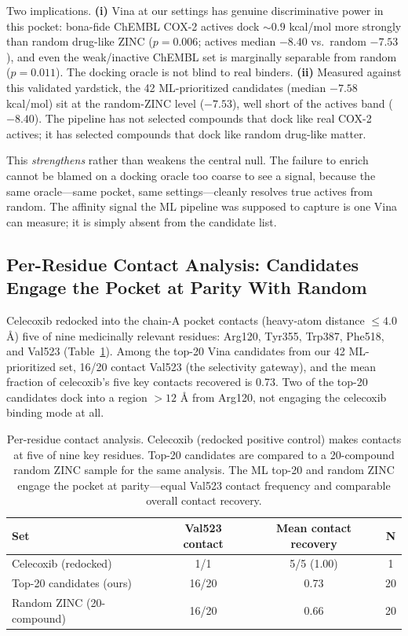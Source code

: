 \documentclass[11pt]{article}
\begin{document}
Two implications. \textbf{(i)} Vina at our settings has genuine discriminative power in this pocket: bona-fide ChEMBL COX-2 actives dock $\sim 0.9$ kcal/mol more strongly than random drug-like ZINC ($p = 0.006$; actives median $-8.40$ vs.\ random $-7.53$), and even the weak/inactive ChEMBL set is marginally separable from random ($p = 0.011$). The docking oracle is not blind to real binders. \textbf{(ii)} Measured against this validated yardstick, the 42 ML-prioritized candidates (median $-7.58$ kcal/mol) sit at the random-ZINC level ($-7.53$), well short of the actives band ($-8.40$). The pipeline has not selected compounds that dock like real COX-2 actives; it has selected compounds that dock like random drug-like matter.

This \emph{strengthens} rather than weakens the central null. The failure to enrich cannot be blamed on a docking oracle too coarse to see a signal, because the same oracle---same pocket, same settings---cleanly resolves true actives from random. The affinity signal the ML pipeline was supposed to capture is one Vina can measure; it is simply absent from the candidate list.

\subsection{Per-Residue Contact Analysis: Candidates Engage the Pocket at Parity With Random}

Celecoxib redocked into the chain-A pocket contacts (heavy-atom distance $\leq 4.0$ \r{A}) five of nine medicinally relevant residues: Arg120, Tyr355, Trp387, Phe518, and Val523 (Table~\ref{tab:contacts}). Among the top-20 Vina candidates from our 42 ML-prioritized set, 16/20 contact Val523 (the selectivity gateway), and the mean fraction of celecoxib's five key contacts recovered is 0.73. Two of the top-20 candidates dock into a region $> 12$ \r{A} from Arg120, not engaging the celecoxib binding mode at all.

\begin{table}[H]
\centering
\small
\caption{Per-residue contact analysis. Celecoxib (redocked positive control) makes contacts at five of nine key residues. Top-20 candidates are compared to a 20-compound random ZINC sample for the same analysis. The ML top-20 and random ZINC engage the pocket at parity---equal Val523 contact frequency and comparable overall contact recovery.}
\label{tab:contacts}
\begin{tabular}{lccc}
\toprule
Set & Val523 contact & Mean contact recovery & N \\
\midrule
Celecoxib (redocked)        & 1/1   & 5/5 (1.00) & 1 \\
Top-20 candidates (ours)    & 16/20 & 0.73        & 20 \\
Random ZINC (20-compound)   & 16/20 & 0.66        & 20 \\
\bottomrule
\end{tabular}
\end{table}
\end{document}
